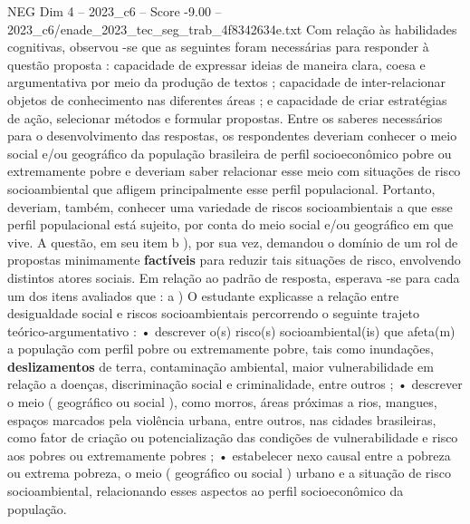 \begin{textsample}{NEG Dim 4 – 2023\_c6 – Score -9.00 – 2023\_c6/enade\_2023\_tec\_seg\_trab\_4f8342634e.txt}
Com relação às habilidades cognitivas, observou -se que as seguintes foram necessárias para responder à questão proposta : capacidade de expressar ideias de maneira clara, coesa e argumentativa por meio da produção de textos ; capacidade de inter-relacionar objetos de conhecimento nas diferentes áreas ; e capacidade de criar estratégias de ação, selecionar métodos e formular propostas.
Entre os saberes necessários para o desenvolvimento das respostas, os respondentes deveriam conhecer o meio social e/ou geográfico da população brasileira de perfil socioeconômico pobre ou extremamente pobre e deveriam saber relacionar esse meio com situações de risco socioambiental que afligem principalmente esse perfil populacional.
Portanto, deveriam, também, conhecer uma variedade de riscos socioambientais a que esse perfil populacional está sujeito, por conta do meio social e/ou geográfico em que vive.
A questão, em seu item b ), por sua vez, demandou o domínio de um rol de propostas minimamente \textbf{factíveis} para reduzir tais situações de risco, envolvendo distintos atores sociais.
Em relação ao padrão de resposta, esperava -se para cada um dos itens avaliados que : a ) O estudante explicasse a relação entre desigualdade social e riscos socioambientais percorrendo o seguinte trajeto teórico-argumentativo : • descrever o(s) risco(s) socioambiental(is) que afeta(m) a população com perfil pobre ou extremamente pobre, tais como inundações, \textbf{deslizamentos} de terra, contaminação ambiental, maior vulnerabilidade em relação a doenças, discriminação social e criminalidade, entre outros ; • descrever o meio ( geográfico ou social ), como morros, áreas próximas a rios, mangues, espaços marcados pela violência urbana, entre outros, nas cidades brasileiras, como fator de criação ou potencialização das condições de vulnerabilidade e risco aos pobres ou extremamente pobres ; • estabelecer nexo causal entre a pobreza ou extrema pobreza, o meio ( geográfico ou social ) urbano e a situação de risco socioambiental, relacionando esses aspectos ao perfil socioeconômico da população.

\end{textsample}
